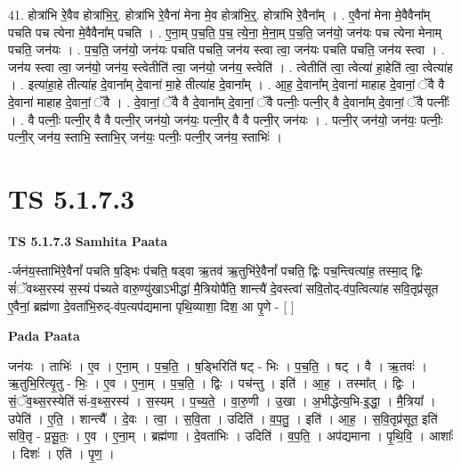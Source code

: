 \documentclass[17pt]{extarticle}
\begin{document}
41. होत्रा॑भि रे॒वैव होत्रा॑भि॒र्॒. होत्रा॑भि रे॒वैना॑ मेना मे॒व होत्रा॑भि॒र्॒. होत्रा॑भि रे॒वैना᳚म् । . ए॒वैना॑ मेना मे॒वैवैना᳚म् पचति पच त्येना मे॒वैवैना᳚म् पचति । . ए॒ना॒म् प॒च॒ति॒ प॒च॒ त्ये॒ना॒ मे॒ना॒म् प॒च॒ति॒ जन॑यो॒ जन॑यः पच त्येना मेनाम् पचति॒ जन॑यः । . प॒च॒ति॒ जन॑यो॒ जन॑यः पचति पचति॒ जन॑य स्त्वा त्वा॒ जन॑यः पचति पचति॒ जन॑य स्त्वा । . जन॑य स्त्वा त्वा॒ जन॑यो॒ जन॑य॒ स्त्वेतीति॑ त्वा॒ जन॑यो॒ जन॑य॒ स्त्वेति॑ । . त्वेतीति॑ त्वा॒ त्वेत्या॑ हा॒हेति॑ त्वा॒ त्वेत्या॑ह । . इत्या॑हा॒हे तीत्या॑ह दे॒वाना᳚म् दे॒वाना॑ मा॒हे तीत्या॑ह दे॒वाना᳚म् । . आ॒ह॒ दे॒वाना᳚म् दे॒वाना॑ माहाह दे॒वानां॒ ॅवै वै दे॒वाना॑ माहाह दे॒वानां॒ ॅवै । . दे॒वानां॒ ॅवै वै दे॒वाना᳚म् दे॒वानां॒ ॅवै पत्नीः॒ पत्नी॒र् वै दे॒वाना᳚म् दे॒वानां॒ ॅवै पत्नीः᳚ । . वै पत्नीः॒ पत्नी॒र् वै वै पत्नी॒र् जन॑यो॒ जन॑यः॒ पत्नी॒र् वै वै पत्नी॒र् जन॑यः । . पत्नी॒र् जन॑यो॒ जन॑यः॒ पत्नीः॒ पत्नी॒र् जन॑य॒ स्ताभि॒ स्ताभि॒र् जन॑यः॒ पत्नीः॒ पत्नी॒र् जन॑य॒ स्ताभिः॑ । \newline
\pagebreak
{}

\section{ TS 5.1.7.3 }

\textbf{TS 5.1.7.3 } \newline
\textbf{Samhita Paata} \newline

-र्जन॑य॒स्ताभि॑रे॒वैनां᳚ पचति ष॒ड्भिः प॑चति॒ षड्वा ऋ॒तव॑ ऋ॒तुभि॑रे॒वैनां᳚ पचति॒ द्विः पच॒न्त्वित्या॑ह॒ तस्मा॒द् द्विः सं॑ॅवथ्स॒रस्य॑ स॒स्यं प॑च्यते वारु॒ण्यु॑खाऽभीद्धा॑ मै॒त्रियोपै॑ति॒ शान्त्यै॑ दे॒वस्त्वा॑ सवि॒तोद्-व॑प॒त्वित्या॑ह सवि॒तृप्र॑सूत ए॒वैनां॒ ब्रह्म॑णा दे॒वता॑भि॒रुद्-व॑प॒त्यप॑द्यमाना पृथि॒व्याशा॒ दिश॒ आ पृ॒णे - [  ] \newline

\textbf{Pada Paata} \newline

जन॑यः । ताभिः॑ । ए॒व । ए॒ना॒म् । प॒च॒ति॒ । ष॒ड्भिरिति॑ षट् - भिः । प॒च॒ति॒ । षट् । वै । ऋ॒तवः॑ । ऋ॒तुभि॒रित्यृ॒तु - भिः॒ । ए॒व । ए॒ना॒म् । प॒च॒ति॒ । द्विः । पच॑न्तु । इति॑ । आ॒ह॒ । तस्मा᳚त् । द्विः । सं॒ॅव॒थ्स॒रस्येति॑ सं-व॒थ्स॒रस्य॑ । स॒स्यम् । प॒च्य॒ते॒ । वा॒रु॒णी । उ॒खा । अ॒भीद्धेत्य॒भि-इ॒द्धा॒ । मै॒त्रिया᳚ । उपेति॑ । ए॒ति॒ । शान्त्यै᳚ । दे॒वः । त्वा॒ । स॒वि॒ता । उदिति॑ । व॒प॒तु॒ । इति॑ । आ॒ह॒ । स॒वि॒तृप्र॑सूत॒ इति॑ सवि॒तृ - प्र॒सू॒तः॒ । ए॒व । ए॒ना॒म् । ब्रह्म॑णा । दे॒वता॑भिः । उदिति॑ । व॒प॒ति॒ । अप॑द्यमाना । पृ॒थि॒वि॒ । आशाः᳚ । दिशः॑ । एति॑ । पृ॒ण॒ ।  \newline
\end{document}
